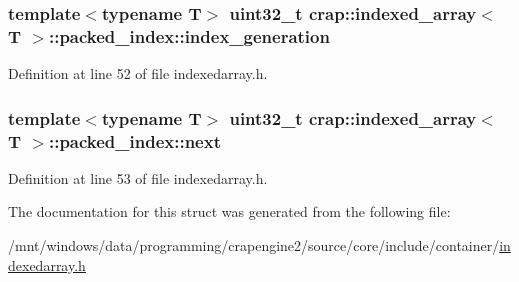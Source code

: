 \hypertarget{structcrap_1_1indexed__array_1_1packed__index_af5423207ebc6a3cbf46e5689d840e2af}{
\subsubsection[{index\+\_\+generation}]{\setlength{\rightskip}{0pt plus 5cm}template$<$typename T$>$ uint32\+\_\+t {\bf crap\+::indexed\+\_\+array}$<$ T $>$\+::packed\+\_\+index\+::index\+\_\+generation}}\label{structcrap_1_1indexed__array_1_1packed__index_af5423207ebc6a3cbf46e5689d840e2af}


Definition at line 52 of file indexedarray.\+h.

\hypertarget{structcrap_1_1indexed__array_1_1packed__index_a790171618ecc2fe9aa6b1b7526c43201}{
\subsubsection[{next}]{\setlength{\rightskip}{0pt plus 5cm}template$<$typename T$>$ uint32\+\_\+t {\bf crap\+::indexed\+\_\+array}$<$ T $>$\+::packed\+\_\+index\+::next}}\label{structcrap_1_1indexed__array_1_1packed__index_a790171618ecc2fe9aa6b1b7526c43201}


Definition at line 53 of file indexedarray.\+h.



The documentation for this struct was generated from the following file\+:\begin{DoxyCompactItemize}
\item 
/mnt/windows/data/programming/crapengine2/source/core/include/container/\hyperlink{indexedarray_8h}{indexedarray.\+h}\end{DoxyCompactItemize}
